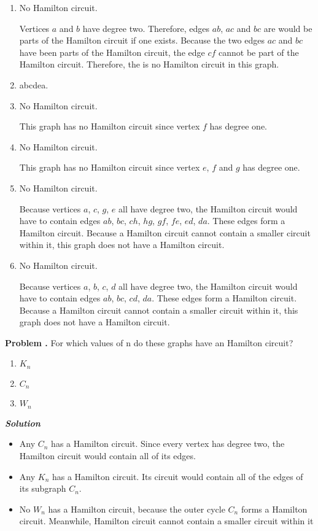 \documentclass[10pt]{article}
\newcounter{problem}
\newcommand{\problem}{\textbf{\refstepcounter{problem}Problem \theproblem.} }
\newcommand{\solution}{\vspace{0.5cm}\textbf{\textit{Solution}} \\}
\begin{document}
\begin{enumerate}[label=(\alph*)]
    \item No Hamilton circuit.
        \par Vertices $a$ and $b$ have degree two. Therefore, edges $ab$, $ac$ and $bc$ are would be
        parts of the Hamilton circuit if one exists. Because the two edges $ac$ and $bc$ have been
        parts of the Hamilton circuit, the edge $cf$ cannot be part of the Hamilton circuit.
        Therefore, the is no Hamilton circuit in this graph.
    \item abcdea.
    \item No Hamilton circuit.
        \par This graph has no Hamilton circuit since vertex $f$ has degree one.
    \item No Hamilton circuit.
        \par This graph has no Hamilton circuit since vertex $e$, $f$ and $g$ has degree one.
    \item No Hamilton circuit.
        \par Because vertices $a$, $c$, $g$, $e$ all have degree two, the Hamilton circuit would
        have to contain edges $ab$, $bc$, $ch$, $hg$, $gf$, $fe$, $ed$, $da$. These edges form a
        Hamilton circuit. Because a Hamilton circuit cannot contain a smaller circuit within it,
        this graph does not have a Hamilton circuit.
    \item No Hamilton circuit.
        \par Because vertices $a$, $b$, $c$, $d$ all have degree two, the Hamilton circuit would
        have to contain edges $ab$, $bc$, $cd$, $da$. These edges form a Hamilton circuit. Because a
        Hamilton circuit cannot contain a smaller circuit within it, this graph does not have a
        Hamilton circuit.
\end{enumerate}

\problem For which values of n do these graphs have an Hamilton circuit?
\begin{enumerate}[label=(\alph*)]
    \item $K_{n}$
    \item $C_{n}$
    \item $W_{n}$
\end{enumerate}

\solution
\begin{itemize}
    \item Any $C_{n}$ has a Hamilton circuit. Since every vertex has degree two, the Hamilton circuit
        would contain all of its edges.
    \item Any $K_{n}$ has a Hamilton circuit. Its circuit would contain all of the edges of its
        subgraph $C_{n}$.
    \item No $W_{n}$ has a Hamilton circuit, because the outer cycle $C_{n}$ forms a Hamilton circuit.
        Meanwhile, Hamilton circuit cannot contain a smaller circuit within it
\end{itemize}
\end{document}
